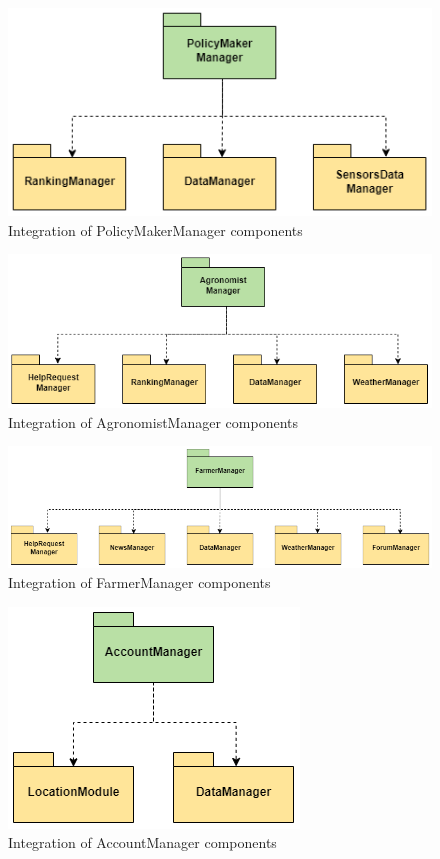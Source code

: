 \documentclass[table, 12pt]{article}
\begin{document}
\begin{figure}[H]
    \centering
    \includegraphics[scale=0.5, center]{assets/Test/pmTest.png}
    \caption{Integration of PolicyMakerManager components}
    \label{fig: integration_PolicyMakerManager}
\end{figure}
\begin{figure}[H]
    \centering
    \includegraphics[scale=0.5, center]{assets/Test/agroTest.png}
    \caption{Integration of AgronomistManager components}
    \label{fig: integration_AgronomistManager}
\end{figure}
\begin{figure}[H]
    \centering
    \includegraphics[scale=0.5, center]{assets/Test/farmerTest.png}
    \caption{Integration of FarmerManager components}
    \label{fig: integration_FarmerManager}
\end{figure}
\begin{figure}[H]
    \centering
    \includegraphics[scale=0.5, center]{assets/Test/accountTest.png}
    \caption{Integration of AccountManager components}
    \label{fig: integration_AccountManager}
\end{figure}
\end{document}

